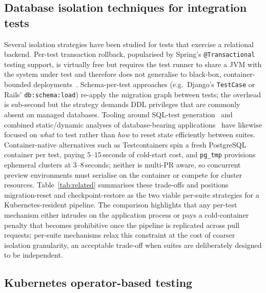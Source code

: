 \subsection{Database isolation techniques for integration tests}
\label{sec:related:isolation}

Several isolation strategies have been studied for tests that exercise a
relational backend. Per-test transaction rollback, popularised by
Spring's \texttt{@Transactional} testing support, is virtually free but
requires the test runner to share a JVM with the system under test and
therefore does not generalise to black-box, container-bounded
deployments~\cite{bertolino2007software}. Schema-per-test approaches
(e.g.\ Django's \texttt{TestCase} or Rails' \texttt{db:schema:load}) re-apply
the migration graph between tests; the overhead is sub-second but the
strategy demands DDL privileges that are commonly absent on managed
databases. Tooling around SQL-test generation~\cite{tuya2007mutating,
castelein2018search} and combined static/dynamic analyses of database-bearing
applications~\cite{halfond2008improving} have likewise focused on \emph{what}
to test rather than \emph{how} to reset state efficiently between suites.
Container-native alternatives such as Testcontainers spin a fresh
PostgreSQL container per test, paying $5$--$15$\,seconds of cold-start cost,
and \texttt{pg\_tmp} provisions ephemeral clusters at $3$--$8$\,seconds;
neither is multi-PR aware, so concurrent preview environments must serialise
on the container or compete for cluster resources. Table~\ref{tab:related}
summarises these trade-offs and positions migration-reset and
checkpoint-restore as the two viable per-suite strategies for a
Kubernetes-resident pipeline. The comparison highlights that any per-test
mechanism either intrudes on the application process or pays a
cold-container penalty that becomes prohibitive once the pipeline is
replicated across pull requests; per-suite mechanisms relax this constraint
at the cost of coarser isolation granularity, an acceptable trade-off when
suites are deliberately designed to be independent.



\subsection{Kubernetes operator-based testing}
\label{sec:related:operators}

